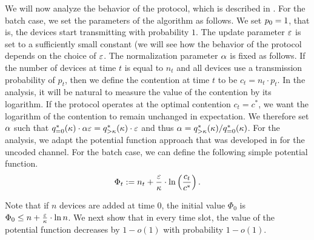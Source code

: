 We will now analyze the behavior of the protocol, which is described in . For the batch case, we set the parameters of the algorithm as follows. We set $p_0=1$, that is, the devices start transmitting with probability $1$. The update parameter $\varepsilon$ is set to a sufficiently small constant (we will see how the behavior of the protocol depends on the choice of $\varepsilon$. The normalization parameter $\alpha$ is fixed as follows. If the number of devices at time $t$ is equal to $n_t$ and all devices use a transmission probability of $p_t$, then we define the contention at time $t$ to be $c_t=n_t\cdot p_t$. In the analysis, it will be natural to measure the value of the contention by its logarithm. If the protocol operates at the optimal contention $c_t=c^*$, we want the logarithm of the contention to remain unchanged in expectation. We therefore set $\alpha$ such that $q_{=0}^*(\kappa)\cdot \alpha\varepsilon = q_{>\kappa}^*(\kappa)\cdot \varepsilon$ and thus $\alpha=q_{>\kappa}^*(\kappa)/q_{=0}^*(\kappa)$. For the analysis, we adapt the potential function approach that was developed in \cite{CJP19_simpleCR} for the uncoded channel. For the batch case, we can define the following simple potential function.
\[
\Phi_t := n_t + \frac{\varepsilon}{\kappa}\cdot\ln\left(\frac{c_t}{c^*}\right).
\]

Note that if $n$ devices are added at time $0$, the initial value $\Phi_0$ is $\Phi_0\leq n + \frac{\varepsilon}{\kappa}\cdot \ln n$. We next show that in every time slot, the value of the potential function decreases by $1-o(1)$ with probability $1-o(1)$.

\begin{lemma}\label{lemma:batchpotential}
  
\end{lemma}
